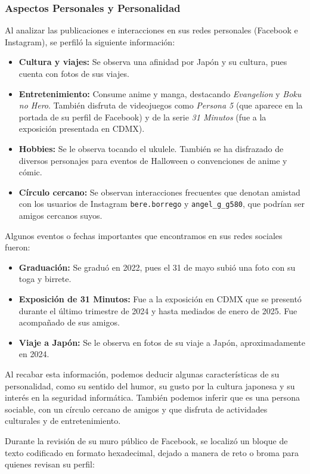 \subsubsection{Aspectos Personales y Personalidad}
Al analizar las publicaciones e interacciones en sus redes personales (Facebook e Instagram), se perfiló la siguiente información:
\begin{itemize}
    \item \textbf{Cultura y viajes:} Se observa una afinidad por Japón y su cultura, pues cuenta con fotos de sus viajes.
    \item \textbf{Entretenimiento:} Consume anime y manga, destacando \textit{Evangelion} y \textit{Boku no Hero}. También disfruta de videojuegos como \textit{Persona 5} (que aparece en la portada de su perfil de Facebook) y de la serie \textit{31 Minutos} (fue a la exposición presentada en CDMX).
    \item \textbf{Hobbies:} Se le observa tocando el ukulele. También se ha disfrazado de diversos personajes para eventos de Halloween o convenciones de anime y cómic.
    \item \textbf{Círculo cercano:} Se observan interacciones frecuentes que denotan amistad con los usuarios de Instagram \texttt{bere.borrego} y \texttt{angel\_g\_g580}, que podrían ser amigos cercanos suyos.
\end{itemize}

Algunos eventos o fechas importantes que encontramos en sus redes sociales fueron:
\begin{itemize}
    \item \textbf{Graduación:} Se graduó en 2022, pues el 31 de mayo subió una foto con su toga y birrete.
    \item \textbf{Exposición de 31 Minutos:} Fue a la exposición en CDMX que se presentó durante el último trimestre de 2024 y hasta mediados de enero de 2025. Fue acompañado de sus amigos.
    \item \textbf{Viaje a Japón:} Se le observa en fotos de su viaje a Japón, aproximadamente en 2024.
\end{itemize}

Al recabar esta información, podemos deducir algunas características de su personalidad, como su sentido del humor, su gusto por la cultura japonesa y su interés en la seguridad informática. También podemos inferir que es una persona sociable, con un círculo cercano de amigos y que disfruta de actividades culturales y de entretenimiento.

Durante la revisión de su muro público de Facebook, se localizó un bloque de texto codificado en formato hexadecimal, dejado a manera de reto o broma para quienes revisan su perfil:

